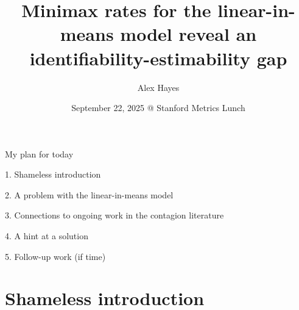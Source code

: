\documentclass[aspectratio=169]{beamer}
\title{Minimax rates for the linear-in-means model reveal an identifiability-estimability gap}
\author{Alex Hayes}
\date{September 22, 2025 @ Stanford Metrics Lunch}
\theoremstyle{remark}
\begin{document}
\maketitle

\begin{frame}{My plan for today}
    
    \large
    
    1. Shameless introduction
    
    2. A problem with the linear-in-means model
    
    3. Connections to ongoing work in the contagion literature
    
    4. A hint at a solution
    
    5. Follow-up work (if time)
    
\end{frame}

\section{Shameless introduction}
\end{document}
